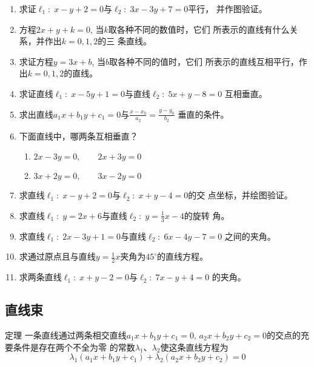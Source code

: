 \begin{ex}
\begin{enumerate}
    \item 求证$\ell_1:\; x-y+2=0$与$\ell_2:\;3x-3y+7=0$平行，
    并作图验证。
    \item 方程$2x+y+k=0$, 当$k$取各种不同的数值时，它们
    所表示的直线有什么关系，并作出$k=0,1,2$的三
    条直线。
    \item 求证方程$y=3x+b$, 当$b$取各种不同的值时，它们
    所表示的直线互相平行，作出$k=0,1,2$的直线。
    \item 求证直线$\ell_1:\; x-5y+1=0$与直线$\ell_2:\; 5x+y-8=0$
    互相垂直。
     \item 求出直线$a_1x+b_1y+c_1=0$与$\frac{x-x_0}{a_2}=\frac{y-y_0}{b_2}$
    垂直的条件。
    \item 下面直线中，哪两条互相垂直？
\begin{enumerate}
    \item $2x-3y=0,\qquad 2x+3y=0$
    \item $3x+2y=0,\qquad 3x-2y=0$
\end{enumerate}

    \item 求直线$\ell_1:\; x-y+2=0$与$\ell_2:\; x+y-4=0$的交
    点坐标，并绘图验证。
    \item 求直线$\ell_1:\; y=2x+6$与直线$\ell_2:\; y=\frac{1}{3}x-4$的旋转
    角。
\item 求直线$\ell_1:\; 2x-3y+1=0$与直线$\ell_2:\; 6x-4y-7=0$
之间的夹角。
\item 求通过原点且与直线$y=\frac{1}{2}x$夹角为$45^{\circ}$的直线方程。
\item 求两条直线$\ell_1:\; x+y-2=0$与$\ell_2:\; 7x-y+4=0$
的夹角。
\end{enumerate}
\end{ex}


\subsection{直线束}



\begin{blk}
    {定理} 一条直线通过两条相交直线$a_1x+b_1y+c_1=0$, 
$a_2x+b_2y+c_2=0$的交点的充要条件是存在两个不全为零
的常数$\lambda_1$、$\lambda_2$使这条直线方程为
\begin{equation}
    \lambda_1(a_1x+b_1y+c_1)+\lambda_2(a_2x+b_2y+c_2)=0
\end{equation}
\end{blk}

